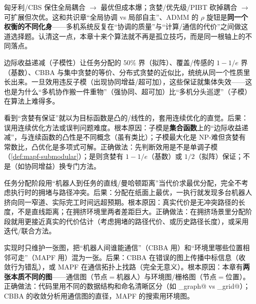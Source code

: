 \begin{insight}
匈牙利/CBS 保住全局耦合 $\to$ 最优但成本爆；贪婪/优先级/PIBT 砍掉耦合 $\to$ 可扩展但次优。这和共识章“全局协调 vs 局部自主”、ADMM 的 $\rho$ 旋钮是\textbf{同一个权衡的不同化身}——多机系统反复在“协调的质量”与“计算/通信的代价”之间做这道选择题。认清这一点，本章十来个算法就不再是孤立技巧，而是同一根轴上的不同落点。
\end{insight}

\begin{insight}
边际收益递减（子模性）让任务分配的 $50\%$ 界（拟阵）、覆盖/传感的 $1-1/e$ 界（基数）、CBBA 与集中贪婪的等价、分布式贪婪的近似比，统统从同一个性质里长出来。一旦效用违反子模（出现协同增益/超可加），这些保证就集体失效——这也是为什么“多机协作搬一件重物”（强协同、超可加）比“多机分头巡逻”（子模）在算法上难得多。
\end{insight}

\begin{pitfall}
看到“贪婪有保证”就以为目标函数是凸的/线性的，套用连续优化的直觉。后果：误用连续优化方法或误判问题难度。根本原因：子模是\textbf{集合函数}上的“边际收益递减”，与连续函数的凸性是不同概念（虽有类比）；子模最大化是 NP-难但贪婪有常数比，凸优化是多项式可解。正确做法：先判断效用是不是单调子模（\cref{def:mapf-submodular}）；是则贪婪有 $1-1/e$（基数）或 $1/2$（拟阵）保证；不是（如协同增益）换专门方法。
\end{pitfall}

\begin{pitfall}
任务分配阶段用“机器人到任务的直线/曼哈顿距离”当代价求最优分配，完全不考虑执行时的拥堵与路径冲突。后果：分配在纸面上最优，一执行就发现多台机器人挤向同一窄道、实际完工时间远超预期。根本原因：真实代价是无冲突路径的长度，不是直线距离；在拥挤环境里两者差距巨大。正确做法：在拥挤场景里分配阶段就用更接近真实的代价估计（考虑拥堵的路径代价、或历史路径长度），或采用迭代/联合方法。
\end{pitfall}

\begin{pitfall}
实现时只维护一张图，把“机器人间谁能通信”（CBBA 用）和“环境里哪些位置相邻可走”（MAPF 用）混为一张。后果：CBBA 在错误的图上传播中标信息（收敛行为错乱），或 MAPF 在通信拓扑上找路（完全无意义）。根本原因：本章有\textbf{两张本质不同的图}——通信图（节点$=$机器人）与环境图/栅格图（节点$=$位置）。正确做法：代码里用不同的数据结构和命名清晰区分（如 \verb@comm_graph@ vs \verb@env_grid@）；CBBA 的收敛分析用通信图的直径，MAPF 的搜索用环境图。
\end{pitfall}

